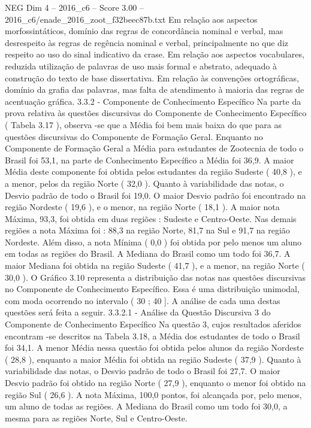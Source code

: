 \begin{textsample}{NEG Dim 4 – 2016\_c6 – Score 3.00 – 2016\_c6/enade\_2016\_zoot\_f32beec87b.txt}
Em relação aos aspectos morfossintáticos, domínio das regras de concordância nominal e verbal, mas desrespeito às regras de regência nominal e verbal, principalmente no que diz respeito ao uso do sinal indicativo da crase.
Em relação aos aspectos vocabulares, reduzida utilização de palavras de uso mais formal e abstrato, adequado à construção do texto de base dissertativa.
Em relação às convenções ortográficas, domínio da grafia das palavras, mas falta de atendimento à maioria das regras de acentuação gráfica. 3.3.2 - Componente de Conhecimento Específico Na parte da prova relativa às questões discursivas do Componente de Conhecimento Específico ( Tabela 3.17 ), observa -se que a Média foi bem mais baixa do que para as questões discursivas do Componente de Formação Geral.
Enquanto no Componente de Formação Geral a Média para estudantes de Zootecnia de todo o Brasil foi 53,1, na parte de Conhecimento Específico a Média foi 36,9.
A maior Média deste componente foi obtida pelos estudantes da região Sudeste ( 40,8 ), e a menor, pelos da região Norte ( 32,0 ).
Quanto à variabilidade das notas, o Desvio padrão de todo o Brasil foi 19,0.
O maior Desvio padrão foi encontrado na região Nordeste ( 19,6 ), e o menor, na região Norte ( 18,1 ).
A maior nota Máxima, 93,3, foi obtida em duas regiões : Sudeste e Centro-Oeste.
Nas demais regiões a nota Máxima foi : 88,3 na região Norte, 81,7 na Sul e 91,7 na região Nordeste.
Além disso, a nota Mínima ( 0,0 ) foi obtida por pelo menos um aluno em todas as regiões do Brasil.
A Mediana do Brasil como um todo foi 36,7.
A maior Mediana foi obtida na região Sudeste ( 41,7 ), e a menor, na região Norte ( 30,0 ).
O Gráfico 3.10 representa a distribuição das notas nas questões discursivas no Componente de Conhecimento Específico.
Essa é uma distribuição unimodal, com moda ocorrendo no intervalo ( 30 ; 40 ].
A análise de cada uma destas questões será feita a seguir. 3.3.2.1 - Análise da Questão Discursiva 3 do Componente de Conhecimento Específico Na questão 3, cujos resultados aferidos encontram -se descritos na Tabela 3.18, a Média dos estudantes de todo o Brasil foi 34,1.
A menor Média nessa questão foi obtida pelos alunos da região Nordeste ( 28,8 ), enquanto a maior Média foi obtida na região Sudeste ( 37,9 ).
Quanto à variabilidade das notas, o Desvio padrão de todo o Brasil foi 27,7.
O maior Desvio padrão foi obtido na região Norte ( 27,9 ), enquanto o menor foi obtido na região Sul ( 26,6 ).
A nota Máxima, 100,0 pontos, foi alcançada por, pelo menos, um aluno de todas as regiões.
A Mediana do Brasil como um todo foi 30,0, a mesma para as regiões Norte, Sul e Centro-Oeste.

\end{textsample}
